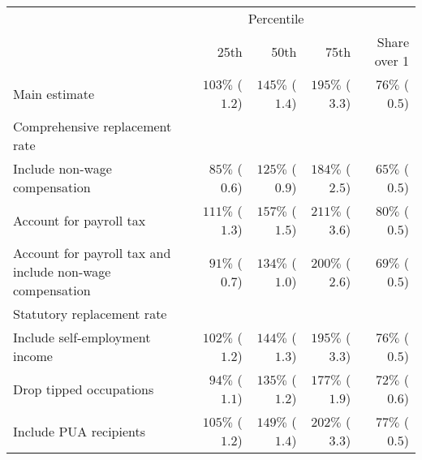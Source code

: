 \captionsetup[table]{labelformat=empty,skip=1pt}
\begin{tabular}{lrrrr}
\toprule
& \multicolumn{3}{c}{Percentile} & \\ 
 \cmidrule(lr){2-4}
 & 25th & 50th & 75th & Share over 1 \\ 
\midrule
Main estimate & $103\%$ ($1.2$)  & $145\%$ ($1.4$)  & $195\%$ ($3.3$)  & $76\%$ ($0.5$)  \\ 
\midrule
\multicolumn{1}{l}{Comprehensive replacement rate} \\\hspace{0.5cm} Include non-wage compensation & $85\%$ ($0.6$)  & $125\%$ ($0.9$)  & $184\%$ ($2.5$)  & $65\%$ ($0.5$)  \\ 
\hspace{0.5cm} Account for payroll tax & $111\%$ ($1.3$)  & $157\%$ ($1.5$)  & $211\%$ ($3.6$)  & $80\%$ ($0.5$)  \\ 
\hspace{0.5cm} Account for payroll tax and include non-wage compensation & $91\%$ ($0.7$)  & $134\%$ ($1.0$)  & $200\%$ ($2.6$)  & $69\%$ ($0.5$)  \\ 
\midrule
\multicolumn{1}{l}{Statutory replacement rate} \\\hspace{0.5cm} Include self-employment income & $102\%$ ($1.2$)  & $144\%$ ($1.3$)  & $195\%$ ($3.3$)  & $76\%$ ($0.5$)  \\ 
\hspace{0.5cm} Drop tipped occupations & $94\%$ ($1.1$)  & $135\%$ ($1.2$)  & $177\%$ ($1.9$)  & $72\%$ ($0.6$)  \\ 
\hspace{0.5cm} Include PUA recipients & $105\%$ ($1.2$)  & $149\%$ ($1.4$)  & $202\%$ ($3.3$)  & $77\%$ ($0.5$)  \\ 
\bottomrule
\end{tabular}

